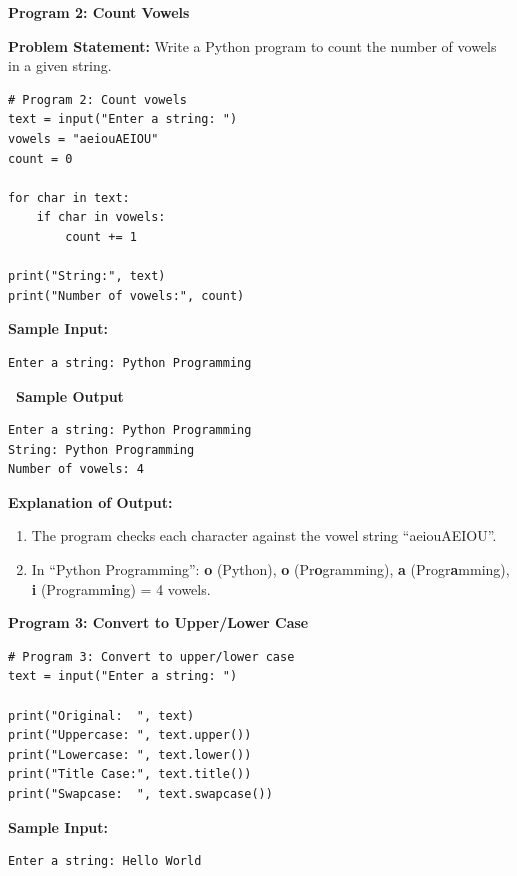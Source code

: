 \documentclass[12pt,a4paper]{article}
\newcommand{\outhead}{\noindent\colorbox{cmrgreen!25}%
  {\textbf{\small\color{cmrdark}~Sample Output~}}\par\vspace{-1pt}}
\begin{document}
\vspace{0.5cm}

\textbf{Program 2: Count Vowels}

\textbf{Problem Statement:}
Write a Python program to count the number of vowels in a given string.

\begin{lstlisting}
# Program 2: Count vowels
text = input("Enter a string: ")
vowels = "aeiouAEIOU"
count = 0

for char in text:
    if char in vowels:
        count += 1

print("String:", text)
print("Number of vowels:", count)
\end{lstlisting}

\textbf{Sample Input:}
\begin{verbatim}
Enter a string: Python Programming
\end{verbatim}

\outhead
\begin{lstlisting}[style=outputstyle]
Enter a string: Python Programming
String: Python Programming
Number of vowels: 4
\end{lstlisting}

\textbf{Explanation of Output:}
\begin{enumerate}
  \item The program checks each character against the vowel string ``aeiouAEIOU''.
  \item In ``Python Programming'': \textbf{o} (Python), \textbf{o} (Pr\textbf{o}gramming), \textbf{a} (Progr\textbf{a}mming), \textbf{i} (Programm\textbf{i}ng) = 4 vowels.
\end{enumerate}

\vspace{0.5cm}

\textbf{Program 3: Convert to Upper/Lower Case}

\begin{lstlisting}
# Program 3: Convert to upper/lower case
text = input("Enter a string: ")

print("Original:  ", text)
print("Uppercase: ", text.upper())
print("Lowercase: ", text.lower())
print("Title Case:", text.title())
print("Swapcase:  ", text.swapcase())
\end{lstlisting}

\textbf{Sample Input:}
\begin{verbatim}
Enter a string: Hello World
\end{verbatim}
\end{document}
